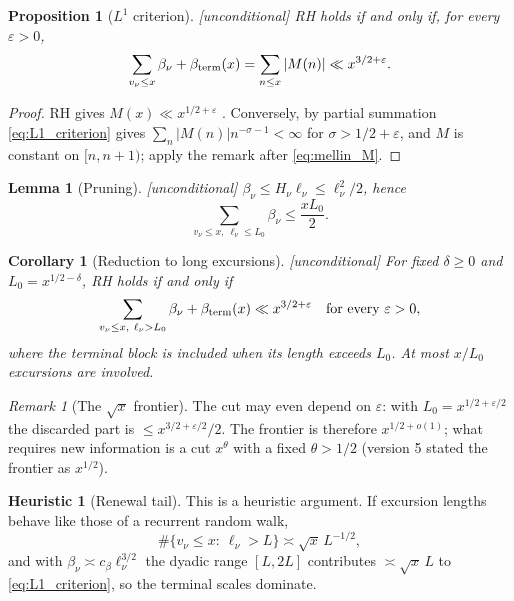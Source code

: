 \documentclass[11pt]{amsart}
\numberwithin{equation}{section}
\theoremstyle{plain}
\newtheorem{proposition}[theorem]{Proposition}
\newtheorem{lemma}[theorem]{Lemma}
\newtheorem{corollary}[theorem]{Corollary}
\theoremstyle{definition}
\newtheorem{heuristic}[theorem]{Heuristic}
\theoremstyle{remark}
\newtheorem{remark}[theorem]{Remark}
\newcommand{\eps}{\varepsilon}
\begin{document}
\begin{proposition}[$L^1$ criterion]
\label{prop:L1}
\emph{[unconditional]} RH holds if and only if, for every $\eps>0$,
\begin{equation}
\label{eq:L1_criterion}
  \sum_{v_\nu\le x}\beta_\nu+\beta_{\rm term}(x)=\sum_{n\le x}|M(n)|
  \ll x^{3/2+\eps}.
\end{equation}
\end{proposition}

\begin{proof}
RH gives $M(x)\ll x^{1/2+\eps}$ \cite[\S14.25]{Titchmarsh1986}. Conversely,
by partial summation \eqref{eq:L1_criterion} gives
$\sum_n|M(n)|n^{-\sigma-1}<\infty$ for $\sigma>1/2+\eps$, and $M$ is
constant on $[n,n+1)$; apply the remark after \eqref{eq:mellin_M}.
\end{proof}

\begin{lemma}[Pruning]
\label{lem:pruning}
\emph{[unconditional]} $\beta_\nu\le H_\nu\ell_\nu\le\ell_\nu^2/2$, hence
\begin{equation}
\label{eq:pruning}
  \sum_{v_\nu\le x,\ \ell_\nu\le L_0}\beta_\nu\le\frac{xL_0}{2}.
\end{equation}
\end{lemma}

\begin{corollary}[Reduction to long excursions]
\label{cor:long}
\emph{[unconditional]} For fixed $\delta\ge0$ and $L_0=x^{1/2-\delta}$, RH
holds if and only if
\begin{equation}
\label{eq:long_reduction}
  \sum_{v_\nu\le x,\ \ell_\nu>L_0}\beta_\nu+\beta_{\rm term}(x)\ll x^{3/2+\eps}
  \quad\text{for every }\eps>0,
\end{equation}
where the terminal block is included when its length exceeds $L_0$. At most
$x/L_0$ excursions are involved.
\end{corollary}

\begin{remark}[The $\sqrt{x}$ frontier]
\label{rem:sqrt_frontier}
The cut may even depend on $\eps$: with $L_0=x^{1/2+\eps/2}$ the discarded
part is $\le x^{3/2+\eps/2}/2$. The frontier is therefore $x^{1/2+o(1)}$;
what requires new information is a cut $x^{\theta}$ with a fixed
$\theta>1/2$ (version 5 stated the frontier as $x^{1/2}$).
\end{remark}

\begin{heuristic}[Renewal tail]
\label{heu:renewal}
This is a heuristic argument. If excursion lengths behave like those of a
recurrent random walk,
\begin{equation}
\label{eq:renewal_tail}
  \#\{v_\nu\le x:\ \ell_\nu>L\}\asymp\sqrt{x}\,L^{-1/2},
\end{equation}
and with $\beta_\nu\asymp c_\beta\ell_\nu^{3/2}$ the dyadic range
$[L,2L]$ contributes $\asymp\sqrt{x}\,L$ to \eqref{eq:L1_criterion}, so the
terminal scales dominate.
\end{heuristic}
\end{document}
